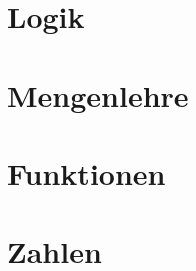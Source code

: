 \section{Logik}\label{sec:logik}



\section{Mengenlehre}\label{sec:mengenlehre}



\section{Funktionen}\label{sec:funktionen}



\section{Zahlen}\label{sec:zahlen}

